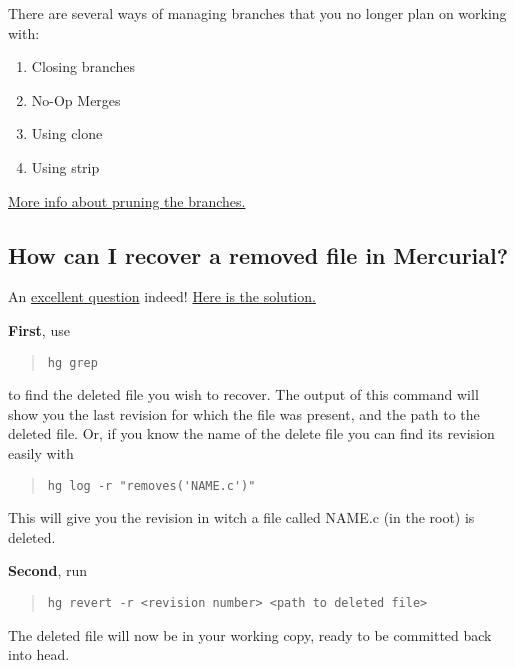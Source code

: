 There are several ways of managing branches that you no longer plan
on working with:

\begin{enumerate}
\item
  Closing branches
\item
  No-Op Merges
\item
  Using clone
\item
  Using strip
\end{enumerate}
\href{http://mercurial.selenic.com/wiki/PruningDeadBranches}{More info about pruning the branches.}

\subsection{How can I recover a removed file in Mercurial?}

An
\href{http://stackoverflow.com/questions/2175427/how-can-i-recover-a-removed-file-in-mercurial-if-at-all}{excellent question}
indeed!
\href{http://stackoverflow.com/a/3174414}{Here is the solution.}

\textbf{First}, use

\begin{quote}
\verb!hg grep!

\end{quote}
to find the deleted file you wish to recover. The output of this
command will show you the last revision for which the file was
present, and the path to the deleted file. Or, if you know the name
of the delete file you can find its revision easily with

\begin{quote}
\verb!hg log -r "removes('NAME.c')"!

\end{quote}
This will give you the revision in witch a file called NAME.c (in
the root) is deleted.

\textbf{Second}, run

\begin{quote}
\verb!hg revert -r <revision number> <path to deleted file>!

\end{quote}
The deleted file will now be in your working copy, ready to be
committed back into head.

